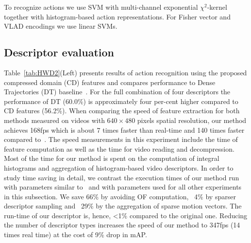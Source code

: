 \documentclass[10pt,twocolumn,letterpaper]{article}
\begin{document}
To recognize actions we use SVM with multi-channel exponential $\chi^2$-kernel~\cite{Zhang07} together with histogram-based action representations. For Fisher vector and VLAD encodings we use linear SVMs.


\subsection{Descriptor evaluation}

Table~\ref{tab:HWD2}(Left) presents results of action recognition using the proposed compressed domain (CD) features %
and compares performance to Dense Trajectories (DT) baseline~\cite{Wang12}. For the full combination of four descriptors the performance of DT (60.0\%) is approximately four per-cent higher compared to CD features (56.2\%). When comparing the speed of feature extraction for both methods measured on videos with $640\times480$ pixels spatial resolution, our method achieves 168fps which is about 7 times faster than real-time and 140 times faster compared to~\cite{Wang12}. The speed measurements in this experiment include the time of feature computation as well as the time for video reading and decompression. Most of the time for our method is spent on the computation of integral histograms and aggregation of histogram-based video descriptors. In order to  study time saving in detail, we contrast the execution times of our method run with parameters similar to~\cite{Wang12} and with parameters used for all other experiments in this subsection. We save 66\% by avoiding OF computation, ~4\% by sparser descriptor sampling and ~29\% by the aggregation of sparse motion vectors. The run-time of our descriptor is, hence, <1\% compared to the original one. Reducing the number of descriptor types increases the speed of our method to 347fps (14 times real time) at the cost of 9\% drop in mAP. 

\end{document}
